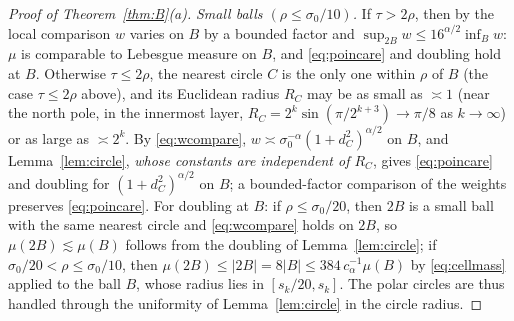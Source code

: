 \documentclass[11pt]{amsart}
\newcommand{\abs}[1]{\lvert #1\rvert}
\theoremstyle{plain}
\theoremstyle{definition}
\theoremstyle{remark}
\begin{document}
\begin{proof}[Proof of Theorem~\ref{thm:B}(a)]
\emph{Small balls $(\rho\le\sigma_0/10)$.} If $\tau>2\rho$, then by the local
comparison $w$ varies on $B$ by a bounded factor and
$\sup_{2B}w\le16^{\alpha/2}\inf_Bw$: $\mu$ is comparable to Lebesgue
measure on $B$, and \eqref{eq:poincare} and doubling hold at $B$. Otherwise
$\tau\le2\rho$, the nearest circle $C$ is the only one within $\rho$ of $B$
(the case $\tau\le2\rho$ above), and its Euclidean radius
$R_C$ may be as small as $\asymp1$ (near the north pole, in the innermost
layer, $R_C=2^k\sin(\pi/2^{k+3})\to\pi/8$ as $k\to\infty$) or
as large as $\asymp2^k$. By \eqref{eq:wcompare}, $w\asymp\sigma_0^{-\alpha}
(1+d_C^2)^{\alpha/2}$ on $B$, and Lemma~\ref{lem:circle}, \emph{whose constants
are independent of $R_C$}, gives \eqref{eq:poincare} and doubling for
$(1+d_C^2)^{\alpha/2}$ on $B$; a bounded-factor comparison of the weights
preserves \eqref{eq:poincare}. For doubling at $B$: if $\rho\le\sigma_0/20$,
then $2B$ is a small ball with the same nearest circle and \eqref{eq:wcompare}
holds on $2B$, so $\mu(2B)\lesssim\mu(B)$ follows from the doubling of
Lemma~\ref{lem:circle}; if $\sigma_0/20<\rho\le\sigma_0/10$, then
$\mu(2B)\le\abs{2B}=8\abs B\le384\,c_\alpha^{-1}\mu(B)$ by \eqref{eq:cellmass}
applied to the ball $B$, whose radius lies in $[s_k/20,s_k]$. The polar circles
are thus handled through
the uniformity of Lemma~\ref{lem:circle} in the circle radius.


\end{proof}
\end{document}
